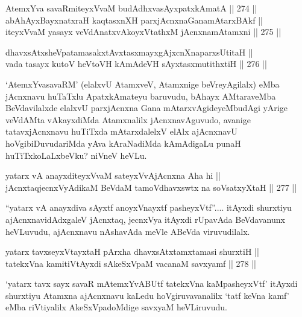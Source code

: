 \begin{shl}
AtemxYva savaRmiteyxVvaM budAdhxvasAyx\s \s patxkAmatA \hfill || 274 ||  \\
abAhAyxBayxnatxraH kaqtasxnXH parxjAcnxnaGanamAtarxBAkf || \\
iteyxVvaM yasayx veVdAnatxvAkoyxVtathxM jAcnxnamAtamxni \hfill || 275 ||  
\end{shl}

\begin{shl}
dhavxsAtxsheVpatamasakxtAvxtasxmayxgAjxcnXnaparxsUtitaH || \\
vada tasayx kutoV heVtoVH kAmAdeVH sAyxtasxmutithxtiH \hfill || 276 ||  
\end{shl}

\begin{artha}
`AtemxYvasavaRM' (elalxvU AtamxveV, Atamxnige beVreyAgilalx) eMba
jAcnxnavu huTaTxlu ApatxkAmateyu baruvudu, bAhayx AMtaraveMba
BeVdavilalxde elalxvU parxjAcnxna Gana mAtarxvAgideyeMbudAgi yArige
veVdAMta vAkayxdiMda Atamxnalilx jAcnxnavAguvudo, avanige
tatavxjAcnxnavu huTiTxda mAtarxdalelxV elAlx ajAcnxnavU
hoVgibiDuvudariMda yAva kAraNadiMda kAmAdigaLu punaH
huTiTxkoLaLxbeVku? niVneV heVLu.
\end{artha}


\begin{shl}
yatarx vA anayxditeyxVvaM sateyxVvAjAcnxna Aha hi || \\
jAcnxtaqjecnxVyAdikaM BeVdaM tamoVdhavxswtx na soV\s satxyXtaH \hfill || 277 || 
\end{shl}

\begin{artha}
``yatarx vA anayxdiva sAyxtf anoyxV\s nayxtf pasheyxVtf''.... itAyxdi shurxtiyu ajAcnxnavidAdxgaleV jAcnxtaq, jecnxVya
itAyxdi rUpavAda BeVdavanunx heVLuvudu, ajAcnxnavu nAshavAda meVle ABeVda viruvudilalx.
\end{artha}


\begin{shl}
yatarx tavxseyxVtayxtaH pArxha dhavxsAtxtamxtamasi shurxtiH || \\
tatekxVna kamitiVtAyxdi sAkeSxVpaM vacanaM savxyamf \hfill || 278 ||   
\end{shl}

\begin{artha}
`yatarx tavx sayx savaR mAtemxYvABUtf tatekxVna kaMpasheyxVtf' itAyxdi shurxtiyu Atamxna ajAcnxnavu kaLedu hoVgiruvavanalilx
`tatf keVna kamf' eMba riVtiyalilx AkeSxVpadoMdige savxyaM heVLiruvudu.
\end{artha}

